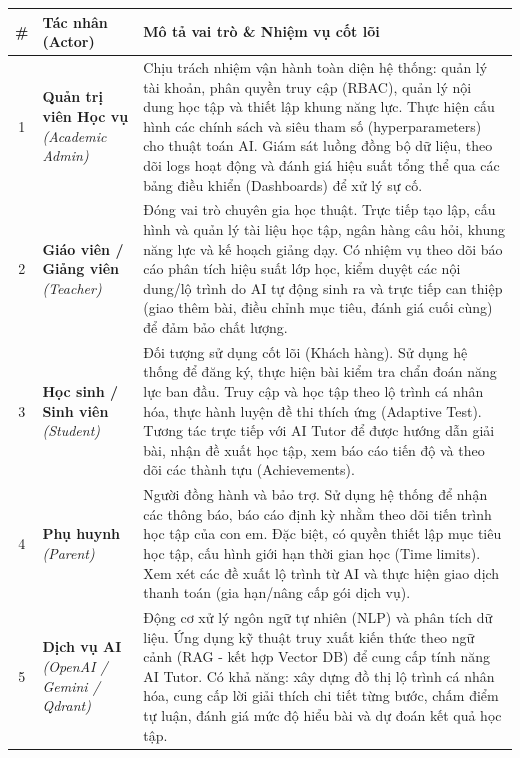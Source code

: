 \renewcommand{\arraystretch}{1.15}
\begin{longtable}{|c|p{3.8cm}|p{9.5cm}|}
	\hline
	\rowcolor{tableheader}
	\textbf{\#} & \textbf{Tác nhân (Actor)} & \textbf{Mô tả vai trò \& Nhiệm vụ cốt lõi} \\ \hline
	\endfirsthead %
	
	1 & \textbf{Quản trị viên Học vụ} \newline \textit{(Academic Admin)} & Chịu trách nhiệm vận hành toàn diện hệ thống: quản lý tài khoản, phân quyền truy cập (RBAC), quản lý nội dung học tập và thiết lập khung năng lực. Thực hiện cấu hình các chính sách và siêu tham số (hyperparameters) cho thuật toán AI. Giám sát luồng đồng bộ dữ liệu, theo dõi logs hoạt động và đánh giá hiệu suất tổng thể qua các bảng điều khiển (Dashboards) để xử lý sự cố. \\ \hline
	2 & \textbf{Giáo viên / Giảng viên} \newline \textit{(Teacher)} & Đóng vai trò chuyên gia học thuật. Trực tiếp tạo lập, cấu hình và quản lý tài liệu học tập, ngân hàng câu hỏi, khung năng lực và kế hoạch giảng dạy. Có nhiệm vụ theo dõi báo cáo phân tích hiệu suất lớp học, kiểm duyệt các nội dung/lộ trình do AI tự động sinh ra và trực tiếp can thiệp (giao thêm bài, điều chỉnh mục tiêu, đánh giá cuối cùng) để đảm bảo chất lượng. \\ \hline
	3 & \textbf{Học sinh / Sinh viên} \newline \textit{(Student)} & Đối tượng sử dụng cốt lõi (Khách hàng). Sử dụng hệ thống để đăng ký, thực hiện bài kiểm tra chẩn đoán năng lực ban đầu. Truy cập và học tập theo lộ trình cá nhân hóa, thực hành luyện đề thi thích ứng (Adaptive Test). Tương tác trực tiếp với AI Tutor để được hướng dẫn giải bài, nhận đề xuất học tập, xem báo cáo tiến độ và theo dõi các thành tựu (Achievements). \\ \hline
	4 & \textbf{Phụ huynh} \newline \textit{(Parent)} & Người đồng hành và bảo trợ. Sử dụng hệ thống để nhận các thông báo, báo cáo định kỳ nhằm theo dõi tiến trình học tập của con em. Đặc biệt, có quyền thiết lập mục tiêu học tập, cấu hình giới hạn thời gian học (Time limits). Xem xét các đề xuất lộ trình từ AI và thực hiện giao dịch thanh toán (gia hạn/nâng cấp gói dịch vụ). \\ \hline
	5 & \textbf{Dịch vụ AI} \newline \textit{(OpenAI / Gemini / Qdrant)} & Động cơ xử lý ngôn ngữ tự nhiên (NLP) và phân tích dữ liệu. Ứng dụng kỹ thuật truy xuất kiến thức theo ngữ cảnh (RAG - kết hợp Vector DB) để cung cấp tính năng AI Tutor. Có khả năng: xây dựng đồ thị lộ trình cá nhân hóa, cung cấp lời giải thích chi tiết từng bước, chấm điểm tự luận, đánh giá mức độ hiểu bài và dự đoán kết quả học tập. \\ \hline

\end{longtable}
